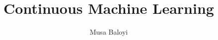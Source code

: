 \documentclass[11pt]{beamer}
\begin{document}
	\author{Musa Baloyi}
	\title{Continuous Machine Learning}
	\begin{frame}[plain]
		\maketitle
	\end{frame}



%
%
%
%
\end{document}
